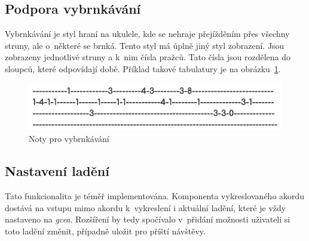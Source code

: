 \subsection{Podpora vybrnkávání}
Vybrnkávání je styl hraní na ukulele, kde se nehraje přejížděním přes všechny struny, ale o~některé se brnká. Tento styl má úplně jiný styl zobrazení. Jsou zobrazeny jednotlivé struny a k~nim čísla pražců. Tato čísla jsou rozdělena do sloupců, které odpovídají době. Příklad takové tabulatury je na obrázku~\ref{fig:tablature}.

\begin{figure}
    \centering
    \includegraphics[width=\textwidth]{assets/picking.png}
    \caption{Noty pro vybrnkávání}
    \label{fig:tablature}
\end{figure}

\subsection{Nastavení ladění}
Tato funkcionalita je téměř implementována. Komponenta vykreslovaného akordu dostává na vstupu mimo akordu k~vykreslení i aktuální ladění, které je vždy nastaveno na \emph{gcea}. Rozšíření by tedy spočívalo v~přidání možnosti uživateli si toto ladění změnit, případně uložit pro příští návštěvy.

